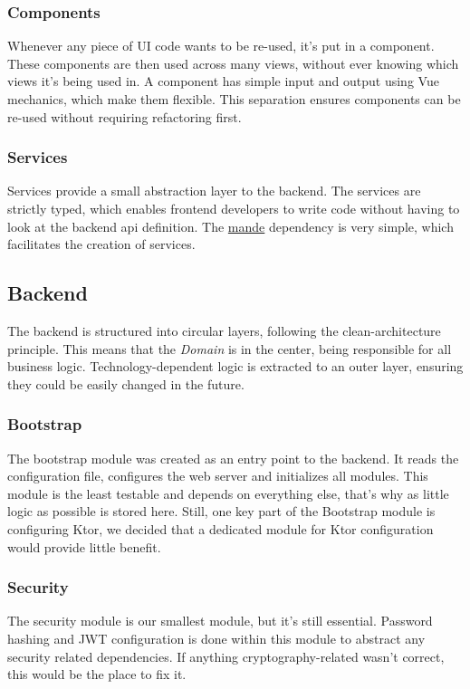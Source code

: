 \subsubsection*{Components}
Whenever any piece of UI code wants to be re-used, it's put in a component.
These components are then used across many views, without ever knowing which views it's being used in.
A component has simple input and output using Vue mechanics, which make them flexible.
This separation ensures components can be re-used without requiring refactoring first.

\subsubsection*{Services}
Services provide a small abstraction layer to the backend.
The services are strictly typed, which enables frontend developers to write code without having to look at the backend api definition.
The \href{https://github.com/posva/mande}{mande} dependency is very simple, which facilitates the creation of services.

\subsection{Backend}
The backend is structured into circular layers, following the clean-architecture principle.
This means that the \emph{Domain} is in the center, being responsible for all business logic.
Technology-dependent logic is extracted to an outer layer, ensuring they could be easily changed in the future.

\subsubsection*{Bootstrap}
The bootstrap module was created as an entry point to the backend.
It reads the configuration file, configures the web server and initializes all modules.
This module is the least testable and depends on everything else, that's why as little logic as possible is stored here.
Still, one key part of the Bootstrap module is configuring Ktor, we decided that a dedicated module for Ktor configuration would provide little benefit.

\subsubsection*{Security}
The security module is our smallest module, but it's still essential.
Password hashing and JWT configuration is done within this module to abstract any security related dependencies.
If anything cryptography-related wasn't correct, this would be the place to fix it.

